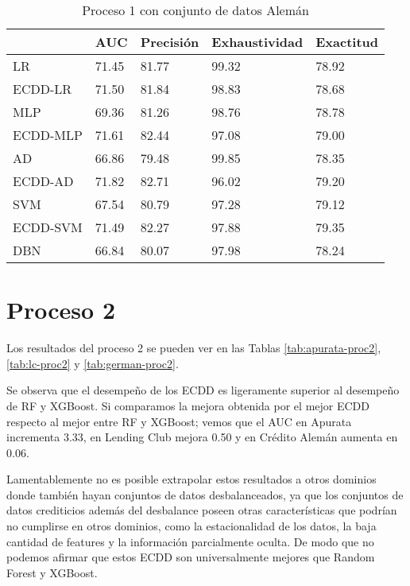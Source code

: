 \begin{table}[]
\centering
\caption{Proceso 1 con conjunto de datos Alemán}
\label{tab:german-proc1}
\begin{tabularx}{0.75\textwidth}{|l|Y Y Y Y|}
				\hline
				& AUC		& Precisión	& Exhaustividad	& Exactitud	\\
				\hline
LR				& 71.45		& 81.77		& 99.32			& 78.92		\\
ECDD-LR			& 71.50		& 81.84		& 98.83			& 78.68		\\
				\hline
MLP				& 69.36		& 81.26		& 98.76			& 78.78		\\
ECDD-MLP		& 71.61		& 82.44		& 97.08			& 79.00		\\
				\hline
AD				& 66.86		& 79.48		& 99.85			& 78.35		\\
ECDD-AD			& 71.82		& 82.71		& 96.02			& 79.20		\\
				\hline
SVM				& 67.54		& 80.79		& 97.28			& 79.12		\\
ECDD-SVM		& 71.49		& 82.27		& 97.88			& 79.35		\\
				\hline
DBN				& 66.84		& 80.07		& 97.98			& 78.24		\\
				\hline
\end{tabularx}
\end{table}


\section{Proceso 2} %

Los resultados del proceso 2 se pueden ver en las Tablas \ref{tab:apurata-proc2}, \ref{tab:lc-proc2} y \ref{tab:german-proc2}.

Se observa que el desempeño de los \ac{ECDD} es ligeramente superior al desempeño de \ac{RF} y \ac{XGBoost}. Si comparamos la mejora obtenida por el mejor \ac{ECDD} respecto al mejor entre RF y XGBoost; vemos que el AUC en Apurata incrementa 3.33, en Lending Club mejora 0.50 y en Crédito Alemán aumenta en 0.06.

Lamentablemente no es posible extrapolar estos resultados a otros dominios donde también hayan conjuntos de datos desbalanceados, ya que los conjuntos de datos crediticios además del desbalance poseen otras características que podrían no cumplirse en otros dominios, como la estacionalidad de los datos, la baja cantidad de features y la información parcialmente oculta. De modo que no podemos afirmar que estos \ac{ECDD} son universalmente mejores que Random Forest y XGBoost.

